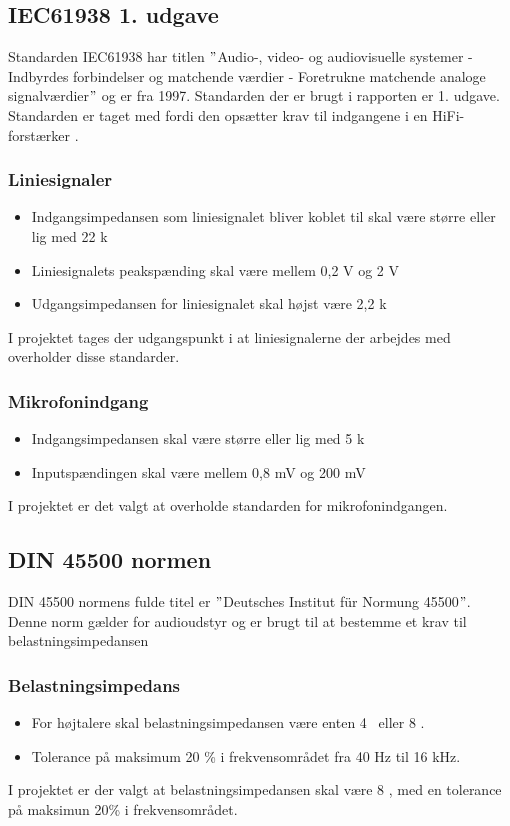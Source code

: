 \subsection*{IEC61938 1. udgave}
\label{IEC61938}
Standarden IEC61938 har titlen $"$Audio-, video- og audiovisuelle systemer - Indbyrdes forbindelser og matchende værdier - Foretrukne matchende analoge signalværdier$"$ og er fra 1997. Standarden der er brugt i rapporten er 1. udgave. Standarden er taget med fordi den opsætter krav til indgangene i en HiFi-forstærker \cite{IEC61938}. 

\subsubsection*{Liniesignaler} 
\begin{itemize}
\item Indgangsimpedansen som liniesignalet bliver koblet til skal være større eller lig med 22 k\ohm 
\item Liniesignalets peakspænding skal være mellem 0,2 V og 2 V
\item Udgangsimpedansen for liniesignalet skal højst være 2,2 k\ohm
\end{itemize}
I projektet tages der udgangspunkt i at liniesignalerne der arbejdes med overholder disse standarder.

\subsubsection*{Mikrofonindgang}
\begin{itemize}
\item Indgangsimpedansen skal være større eller lig med 5 k\ohm
\item Inputspændingen skal være mellem 0,8 mV og 200 mV
\end{itemize}
I projektet er det valgt at overholde standarden for mikrofonindgangen.

\subsection*{DIN 45500 normen}
\label{DIN45500}
DIN 45500 normens fulde titel er $"$Deutsches Institut f\"{u}r Normung 45500$"$. Denne norm gælder for audioudstyr og er brugt til at bestemme et krav til belastningsimpedansen

\subsubsection*{Belastningsimpedans}
\begin{itemize}
\item For højtalere skal belastningsimpedansen være enten 4 \ohm~eller 8 \ohm.
\item Tolerance på maksimum 20 \% i frekvensområdet fra 40 Hz til 16 kHz.
\end{itemize}
I projektet er der valgt at belastningsimpedansen skal være 8 \ohm, med en tolerance på maksimun 20\% i frekvensområdet.
